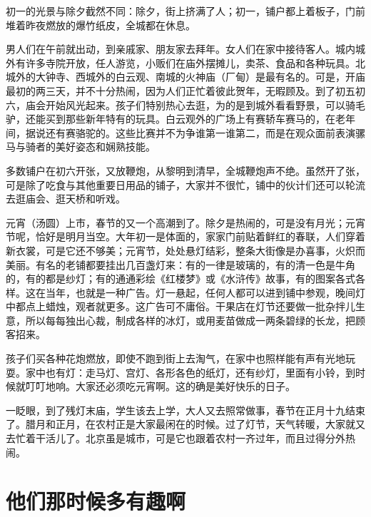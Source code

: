\documentclass[12pt,UTF-8,openany]{ctexbook}
\begin{document}
\begin{Large}
    初一的光景与除夕截然不同：除夕，街上挤满了人；初一，铺户都上着板子，门前堆着昨夜燃放的爆竹纸皮，全城都在休息。
    
    男人们在午前就出动，到亲戚家、朋友家去拜年。女人们在家中接待客人。城内城外有许多寺院开放，任人游览，小贩们在庙外摆摊儿，卖茶、食品和各种玩具。北城外的大钟寺、西城外的白云观、南城的火神庙（厂甸）是最有名的。可是，开庙最初的两三天，并不十分热闹，因为人们正忙着彼此贺年，无暇顾及。到了初五初六，庙会开始风光起来。孩子们特别热心去逛，为的是到城外看看野景，可以骑毛驴，还能买到那些新年特有的玩具。白云观外的广场上有赛轿车赛马的，在老年间，据说还有赛骆驼的。这些比赛并不为争谁第一谁第二，而是在观众面前表演骡马与骑者的美好姿态和娴熟技能。
    
    多数铺户在初六开张，又放鞭炮，从黎明到清早，全城鞭炮声不绝。虽然开了张，可是除了吃食与其他重要日用品的铺子，大家并不很忙，铺中的伙计们还可以轮流去逛庙会、逛天桥和听戏。
    
    元宵（汤圆）上市，春节的又一个高潮到了。除夕是热闹的，可是没有月光；元宵节呢，恰好是明月当空。大年初一是体面的，家家门前贴着鲜红的春联，人们穿着新衣裳，可是它还不够美；元宵节，处处悬灯结彩，整条大街像是办喜事，火炽而美丽。有名的老铺都要挂出几百盏灯来：有的一律是玻璃的，有的清一色是牛角的，有的都是纱灯；有的通通彩绘《红楼梦》或《水浒传》故事，有的图案各式各样。这在当年，也就是一种广告。灯一悬起，任何人都可以进到铺中参观，晚间灯中都点上蜡烛，观者就更多。这广告可不庸俗。干果店在灯节还要做一批杂拌儿生意，所以每每独出心裁，制成各样的冰灯，或用麦苗做成一两条碧绿的长龙，把顾客招来。
    
    孩子们买各种花炮燃放，即使不跑到街上去淘气，在家中也照样能有声有光地玩耍。家中也有灯：走马灯、宫灯、各形各色的纸灯，还有纱灯，里面有小铃，到时候就叮叮地响。大家还必须吃元宵啊。这的确是美好快乐的日子。
    
    一眨眼，到了残灯末庙，学生该去上学，大人又去照常做事，春节在正月十九结束了。腊月和正月，在农村正是大家最闲在的时候。过了灯节，天气转暖，大家就又去忙着干活儿了。北京虽是城市，可是它也跟着农村一齐过年，而且过得分外热闹。
    
\end{Large}

\chapter{他们那时候多有趣啊}
\end{document}
